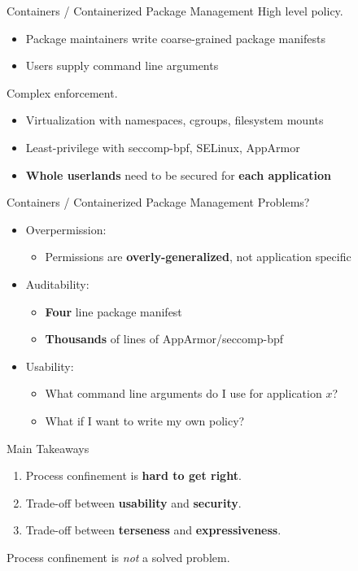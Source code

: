 \documentclass[12pt, dvipsnames, aspectratio=169]{beamer}
\begin{document}
\begin{frame}[c]{Containers / Containerized Package Management}
High level policy.
\begin{itemize}
    \item Package maintainers write coarse-grained package manifests
    \item Users supply command line arguments
\end{itemize}
\vfill
Complex enforcement.
\begin{itemize}
    \item Virtualization with namespaces, cgroups, filesystem mounts
    \item Least-privilege with seccomp-bpf, SELinux, AppArmor
    \item \textbf{Whole userlands} need to be secured for \textbf{each application}
\end{itemize}
\end{frame}

\begin{frame}[c]{Containers / Containerized Package Management}
Problems?
\begin{itemize}
    \item Overpermission:
    \begin{itemize}
        \item Permissions are \textbf{overly-generalized}, not application specific
    \end{itemize}
    \vfill
    \item Auditability:
    \begin{itemize}
        \item \textbf{Four} line package manifest
        \item \textbf{Thousands} of lines of AppArmor/seccomp-bpf
    \end{itemize}
    \vfill
    \item Usability:
    \begin{itemize}
        \item What command line arguments do I use for application $x$?
        \item What if I want to write my own policy?
    \end{itemize}
\end{itemize}
\end{frame}

\begin{frame}[c]{Main Takeaways}
\begin{enumerate}
    \item Process confinement is \textbf{hard to get right}.
    \item Trade-off between \textbf{usability} and \textbf{security}.
    \item Trade-off between \textbf{terseness} and \textbf{expressiveness}.
\end{enumerate}
\vfill
\begin{center}
\LARGE Process confinement is \textit{not} a solved problem.
\end{center}
\end{frame}
\end{document}
